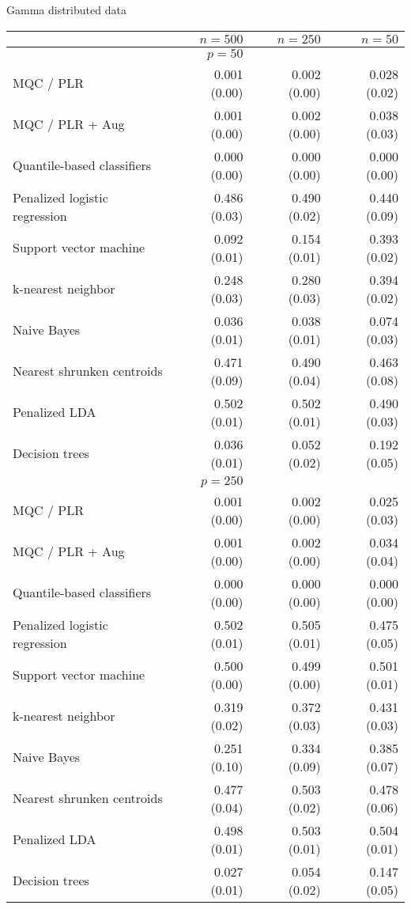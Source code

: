 \begin{table}[p]
  \centering
  Gamma distributed data \\ [2ex]
  \begin{adjustbox}{max size={\textwidth}{10cm}}
    \begin{tabular}{l@{\extracolsep{15mm}}rrr}
      
      \hline
      & $n=500$ & $n=250$ & $n=50$ \\ 
      \hline
      & $p = 50$ \\
      \hline

      MQC / PLR & 0.001 (0.00) & 0.002 (0.00) & 0.028 (0.02) \\ 
      MQC / PLR + Aug & 0.001 (0.00) & 0.002 (0.00) & 0.038 (0.03) \\ 
      Quantile-based classifiers & 0.000 (0.00) & 0.000 (0.00) & 0.000 (0.00) \\ 
      Penalized logistic regression & 0.486 (0.03) & 0.490 (0.02) & 0.440 (0.09) \\ 
      Support vector machine & 0.092 (0.01) & 0.154 (0.01) & 0.393 (0.02) \\ 
      k-nearest neighbor & 0.248 (0.03) & 0.280 (0.03) & 0.394 (0.02) \\ 
      Naive Bayes & 0.036 (0.01) & 0.038 (0.01) & 0.074 (0.03) \\ 
      Nearest shrunken centroids & 0.471 (0.09) & 0.490 (0.04) & 0.463 (0.08) \\ 
      Penalized LDA & 0.502 (0.01) & 0.502 (0.01) & 0.490 (0.03) \\ 
      Decision trees & 0.036 (0.01) & 0.052 (0.02) & 0.192 (0.05) \\ [2ex]

      \hline
      & $p = 250$ \\
      \hline

      MQC / PLR & 0.001 (0.00) & 0.002 (0.00) & 0.025 (0.03) \\ 
      MQC / PLR + Aug & 0.001 (0.00) & 0.002 (0.00) & 0.034 (0.04) \\ 
      Quantile-based classifiers & 0.000 (0.00) & 0.000 (0.00) & 0.000 (0.00) \\ 
      Penalized logistic regression & 0.502 (0.01) & 0.505 (0.01) & 0.475 (0.05) \\ 
      Support vector machine & 0.500 (0.00) & 0.499 (0.00) & 0.501 (0.01) \\ 
      k-nearest neighbor & 0.319 (0.02) & 0.372 (0.03) & 0.431 (0.03) \\ 
      Naive Bayes & 0.251 (0.10) & 0.334 (0.09) & 0.385 (0.07) \\ 
      Nearest shrunken centroids & 0.477 (0.04) & 0.503 (0.02) & 0.478 (0.06) \\ 
      Penalized LDA & 0.498 (0.01) & 0.503 (0.01) & 0.504 (0.01) \\ 
      Decision trees & 0.027 (0.01) & 0.054 (0.02) & 0.147 (0.05) \\ [2ex]


\end{tabular}
\end{adjustbox}
\end{table}
